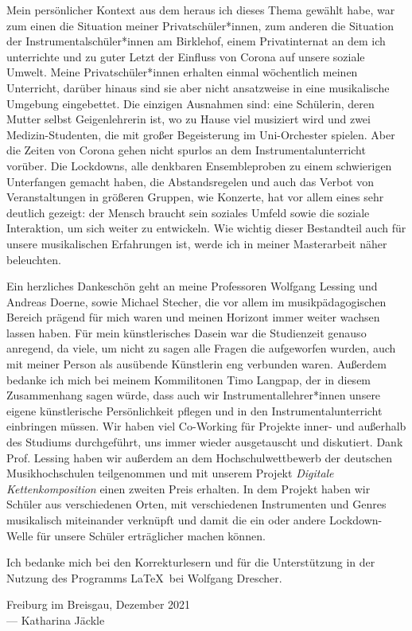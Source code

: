 
Mein persönlicher Kontext aus dem heraus ich dieses Thema gewählt habe, war zum
einen die Situation meiner Privatschüler*innen, zum anderen die Situation der
Instrumentalschüler*innen am Birklehof, einem Privatinternat an dem ich
unterrichte und zu guter Letzt der Einfluss von Corona auf unsere soziale
Umwelt. Meine Privatschüler*innen erhalten einmal wöchentlich meinen Unterricht,
darüber hinaus sind sie aber nicht ansatzweise in eine musikalische Umgebung
eingebettet. Die einzigen Ausnahmen sind: eine Schülerin, deren Mutter selbst
Geigenlehrerin ist, wo zu Hause viel musiziert wird und zwei Medizin-Studenten,
die mit großer Begeisterung im Uni-Orchester spielen. Aber die Zeiten von Corona
gehen nicht spurlos an dem Instrumentalunterricht vorüber. Die Lockdowns, alle
denkbaren Ensembleproben zu einem schwierigen Unterfangen gemacht haben, die
Abstandsregelen und auch das Verbot von Veranstaltungen in größeren Gruppen, wie
Konzerte, hat vor allem eines sehr deutlich gezeigt: der Mensch braucht sein
soziales Umfeld sowie die soziale Interaktion, um sich weiter zu entwickeln. Wie
wichtig dieser Bestandteil auch für unsere musikalischen Erfahrungen ist, werde
ich in meiner Masterarbeit näher beleuchten.

Ein herzliches Dankeschön geht an meine Professoren Wolfgang Lessing und Andreas
Doerne, sowie Michael Stecher, die vor allem im musikpädagogischen Bereich
prägend für mich waren und meinen Horizont immer weiter wachsen lassen haben.
Für mein künstlerisches Dasein war die Studienzeit genauso anregend, da viele,
um nicht zu sagen alle Fragen die aufgeworfen wurden, auch mit meiner Person als
ausübende Künstlerin eng verbunden waren. Außerdem bedanke ich mich bei meinem
Kommilitonen Timo Langpap, der in diesem Zusammenhang sagen würde, dass
auch wir Instrumentallehrer*innen unsere eigene künstlerische Persönlichkeit
pflegen und in den Instrumentalunterricht einbringen müssen. Wir haben viel
Co-Working für Projekte inner- und außerhalb des Studiums durchgeführt, uns
immer wieder ausgetauscht und diskutiert. Dank Prof. Lessing haben wir außerdem
an dem Hochschulwettbewerb der deutschen Musikhochschulen teilgenommen und mit
unserem Projekt \emph{Digitale Kettenkomposition} einen zweiten Preis erhalten.
In dem Projekt haben wir Schüler aus verschiedenen Orten, mit verschiedenen
Instrumenten und Genres musikalisch miteinander verknüpft und damit die ein oder
andere Lockdown-Welle für unsere Schüler erträglicher machen können. 

Ich bedanke mich bei den Korrekturlesern und für die Unterstützung in der
Nutzung des Programms \LaTeX\ bei Wolfgang Drescher.




\vspace{0.5cm}

\begin{flushright}
	{
		\small
		Freiburg im Breisgau, Dezember 2021\\
		--- Katharina Jäckle }
\end{flushright}
